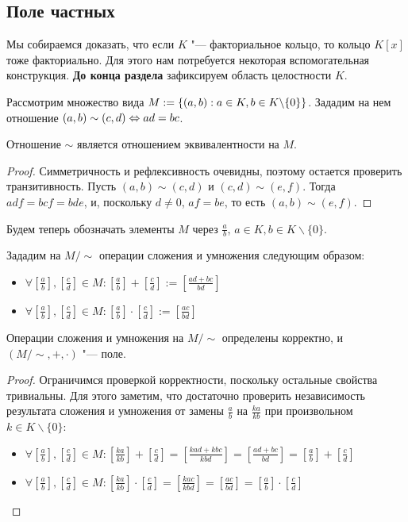 \subsection{Поле частных}

Мы собираемся доказать, что если $K$ "--- факториальное кольцо, то кольцо $K[x]$ тоже факториально. Для этого нам потребуется некоторая вспомогательная конструкция. \textbf{До конца раздела} зафиксируем область целостности $K$.

\begin{definition}
	Рассмотрим множество вида $M \hm{:=} \{(a, b) : a \in K, b \in K \backslash \{0\}\}$. Зададим на нем отношение $(a, b) \sim (c, d) \Leftrightarrow ad = bc$.
\end{definition}

\begin{proposition}
	Отношение $\sim$ является отношением эквивалентности на $M$.
\end{proposition}

\begin{proof}
	Симметричность и рефлексивность очевидны, поэтому остается проверить транзитивность. Пусть $(a, b) \sim (c, d)$ и $(c, d) \sim (e, f)$. Тогда $adf = bcf = bde$, и, поскольку $d \ne 0$, $af = be$, то есть $(a, b) \sim (e, f)$.
\end{proof}

Будем теперь обозначать элементы $M$ через $\frac{a}{b}$, $a \in K, b \in K \backslash \{0\}$.

\begin{definition}
	Зададим на $M /{\sim}$ операции сложения и умножения следующим образом:
	\begin{itemize}
		\item $\forall [\frac{a}{b}], [\frac{c}{d}] \in M: [\frac{a}{b}] + [\frac{c}{d}] := [\frac{ad + bc}{bd}]$
		\item $\forall [\frac{a}{b}], [\frac{c}{d}] \in M: [\frac{a}{b}] \cdot [\frac{c}{d}] := [\frac{ac}{bd}]$
	\end{itemize}
\end{definition}

\begin{proposition}
	Операции сложения и умножения на $M /{\sim}$ определены корректно, и $(M/{\sim}, +, \cdot)$ "--- поле.
\end{proposition}

\begin{proof}
	Ограничимся проверкой корректности, поскольку остальные свойства тривиальны. Для этого заметим, что достаточно проверить независимость результата сложения и умножения от замены $\frac ab$ на $\frac{ka}{kb}$ при произвольном $k \in K \backslash \{0\}$:
	\begin{itemize}
		\item $\forall [\frac{a}{b}], [\frac{c}{d}] \in M: [\frac{ka}{kb}] + [\frac{c}{d}] = [\frac{kad + kbc}{kbd}] = [\frac{ad + bc}{bd}] = [\frac{a}{b}] + [\frac{c}{d}]$
		\item $\forall [\frac{a}{b}], [\frac{c}{d}] \in M: [\frac{ka}{kb}] \cdot [\frac{c}{d}] = [\frac{kac}{kbd}] = [\frac{ac}{bd}] = [\frac{a}{b}] \cdot [\frac{c}{d}]$\qedhere
	\end{itemize}
\end{proof}

